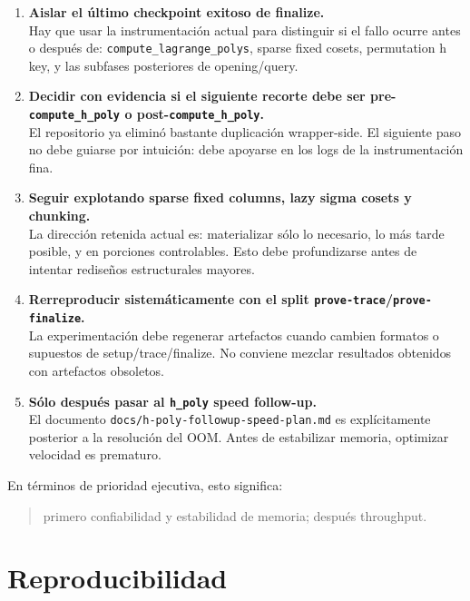 \documentclass[11pt,a4paper]{article}
\begin{document}
\begin{enumerate}
  \item \textbf{Aislar el \'ultimo checkpoint exitoso de finalize.}\\
  Hay que usar la instrumentaci\'on actual para distinguir si el fallo ocurre antes o despu\'es de:
  \texttt{compute\_lagrange\_polys},
  sparse fixed cosets,
  permutation h key,
  y las subfases posteriores de opening/query.

  \item \textbf{Decidir con evidencia si el siguiente recorte debe ser pre-\texttt{compute\_h\_poly} o post-\texttt{compute\_h\_poly}.}\\
  El repositorio ya elimin\'o bastante duplicaci\'on wrapper-side. El siguiente paso no debe guiarse por intuici\'on:
  debe apoyarse en los logs de la instrumentaci\'on fina.

  \item \textbf{Seguir explotando sparse fixed columns, lazy sigma cosets y chunking.}\\
  La direcci\'on retenida actual es:
  materializar s\'olo lo necesario, lo m\'as tarde posible, y en porciones controlables.
  Esto debe profundizarse antes de intentar redise\~nos estructurales mayores.

  \item \textbf{Rerreproducir sistem\'aticamente con el split \texttt{prove-trace}/\texttt{prove-finalize}.}\\
  La experimentaci\'on debe regenerar artefactos cuando cambien formatos o supuestos de setup/trace/finalize.
  No conviene mezclar resultados obtenidos con artefactos obsoletos.

  \item \textbf{S\'olo despu\'es pasar al \texttt{h\_poly} speed follow-up.}\\
  El documento \texttt{docs/h-poly-followup-speed-plan.md} es expl\'icitamente posterior a la resoluci\'on del OOM.
  Antes de estabilizar memoria, optimizar velocidad es prematuro.
\end{enumerate}

En t\'erminos de prioridad ejecutiva, esto significa:

\begin{quote}
primero confiabilidad y estabilidad de memoria; despu\'es throughput.
\end{quote}

\section{Reproducibilidad}
\end{document}
